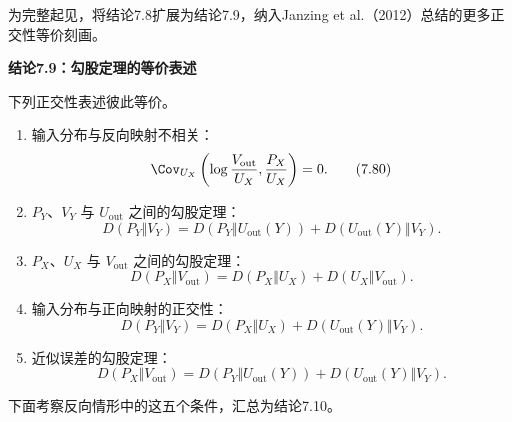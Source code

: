 为完整起见，将结论7.8扩展为结论7.9，纳入Janzing et al.（2012）总结的更多正交性等价刻画。

\par\medskip{}\noindent\textbf{结论7.9：勾股定理的等价表述}\par
下列正交性表述彼此等价。
\begin{enumerate}
\item 输入分布与反向映射不相关：
\begin{equation}
\Cov_{U_X}\left(\log\frac{V_{\mathrm{out}}}{U_X},\frac{P_X}{U_X}\right)=0.
\tag{7.80}
\end{equation}
\item $P_Y$、$V_Y$ 与 $U_{\mathrm{out}}$ 之间的勾股定理：
\begin{equation}
D(P_Y\Vert V_Y)=D(P_Y\Vert U_{\mathrm{out}}(Y))+D(U_{\mathrm{out}}(Y)\Vert V_Y).
\tag{7.81}
\end{equation}
\item $P_X$、$U_X$ 与 $V_{\mathrm{out}}$ 之间的勾股定理：
\begin{equation}
D(P_X\Vert V_{\mathrm{out}})=D(P_X\Vert U_X)+D(U_X\Vert V_{\mathrm{out}}).
\tag{7.82}
\end{equation}
\item 输入分布与正向映射的正交性：
\begin{equation}
D(P_Y\Vert V_Y)=D(P_X\Vert U_X)+D(U_{\mathrm{out}}(Y)\Vert V_Y).
\tag{7.83}
\end{equation}
\item 近似误差的勾股定理：
\begin{equation}
D(P_X\Vert V_{\mathrm{out}})=D(P_Y\Vert U_{\mathrm{out}}(Y))+D(U_{\mathrm{out}}(Y)\Vert V_Y).
\tag{7.84}
\end{equation}
\end{enumerate}
下面考察反向情形中的这五个条件，汇总为结论7.10。

